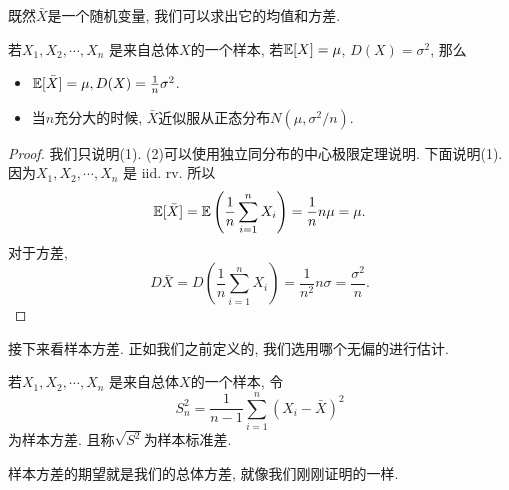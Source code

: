 既然$\bar X$是一个随机变量, 我们可以求出它的均值和方差. 

\begin{theorem}
    若$X_1, X_2, \cdots, X_n$ 是来自总体$X$的一个样本, 若$\mathbb E[X]=\mu$, $D(X)=\sigma^2$, 那么
    \begin{itemize}
        \item $\mathbb E[\bar X]=\mu, D(X)=\frac 1n \sigma^2$.
        \item 当$n$充分大的时候, $\bar X$近似服从正态分布$N(\mu, \sigma^2/n)$.
    \end{itemize} 
\end{theorem}

\begin{proof}
    我们只说明(1). (2)可以使用独立同分布的中心极限定理说明.
    下面说明(1). 因为$X_1, X_2, \cdots, X_n$ 是 iid. rv. 所以
    $$
    \mathbb E[\bar X] = \mathbb{E}\left(\frac 1n \sum_{i=1}^{n}X_i\right)=\frac 1n n\mu = \mu.
    $$
    对于方差, 
    $$
    D{\bar X} = D\left(\frac 1n \sum_{i=1}^{n}X_i\right)=\frac 1{n^2} n\sigma = \frac {\sigma^2}{n}.
    $$
\end{proof}

接下来看样本方差. 正如我们之前定义的, 我们选用哪个无偏的进行估计. 

\begin{definition}
    若$X_1, X_2, \cdots, X_n$ 是来自总体$X$的一个样本, 令 
    $$
S_n^2=\frac{1}{n-1} \sum_{i=1}^n\left(X_i-\bar{X}\right)^2
$$
为样本方差. 且称$\sqrt{S^2}$为样本标准差. 
\end{definition}

样本方差的期望就是我们的总体方差, 就像我们刚刚证明的一样. 